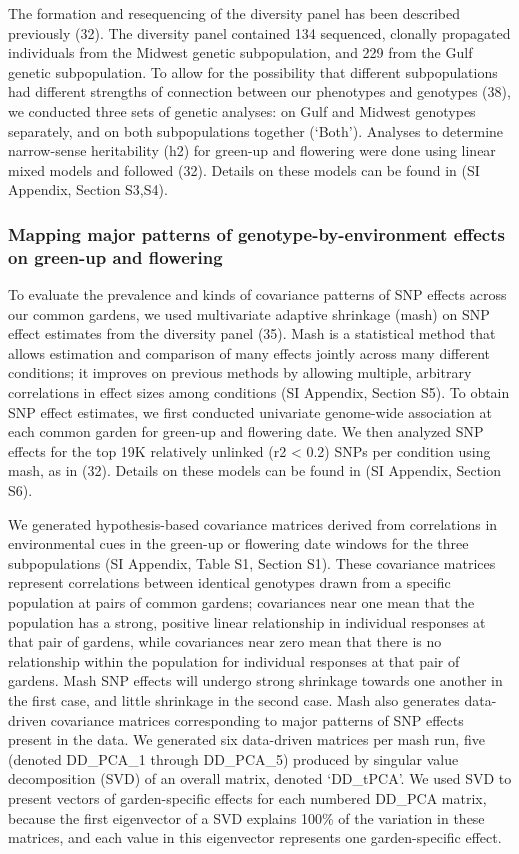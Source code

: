 \documentclass[
  9pt,
  twocolumn,
  twoside]{pnas-new}
\begin{document}
The formation and resequencing of the diversity panel has been described
previously (32). The diversity panel contained 134 sequenced, clonally
propagated individuals from the Midwest genetic subpopulation, and 229
from the Gulf genetic subpopulation. To allow for the possibility that
different subpopulations had different strengths of connection between
our phenotypes and genotypes (38), we conducted three sets of genetic
analyses: on Gulf and Midwest genotypes separately, and on both
subpopulations together (`Both'). Analyses to determine narrow-sense
heritability (h2) for green-up and flowering were done using linear
mixed models and followed (32). Details on these models can be found in
(SI Appendix, Section S3,S4).

\subsubsection{Mapping major patterns of genotype-by-environment effects
on green-up and
flowering}\label{mapping-major-patterns-of-genotype-by-environment-effects-on-green-up-and-flowering-1}

To evaluate the prevalence and kinds of covariance patterns of SNP
effects across our common gardens, we used multivariate adaptive
shrinkage (mash) on SNP effect estimates from the diversity panel (35).
Mash is a statistical method that allows estimation and comparison of
many effects jointly across many different conditions; it improves on
previous methods by allowing multiple, arbitrary correlations in effect
sizes among conditions (SI Appendix, Section S5). To obtain SNP effect
estimates, we first conducted univariate genome-wide association at each
common garden for green-up and flowering date. We then analyzed SNP
effects for the top 19K relatively unlinked (r2 \textless{} 0.2) SNPs
per condition using mash, as in (32). Details on these models can be
found in (SI Appendix, Section S6).

We generated hypothesis-based covariance matrices derived from
correlations in environmental cues in the green-up or flowering date
windows for the three subpopulations (SI Appendix, Table S1, Section
S1). These covariance matrices represent correlations between identical
genotypes drawn from a specific population at pairs of common gardens;
covariances near one mean that the population has a strong, positive
linear relationship in individual responses at that pair of gardens,
while covariances near zero mean that there is no relationship within
the population for individual responses at that pair of gardens. Mash
SNP effects will undergo strong shrinkage towards one another in the
first case, and little shrinkage in the second case. Mash also generates
data-driven covariance matrices corresponding to major patterns of SNP
effects present in the data. We generated six data-driven matrices per
mash run, five (denoted DD\_PCA\_1 through DD\_PCA\_5) produced by
singular value decomposition (SVD) of an overall matrix, denoted
`DD\_tPCA'. We used SVD to present vectors of garden-specific effects
for each numbered DD\_PCA matrix, because the first eigenvector of a SVD
explains 100\% of the variation in these matrices, and each value in
this eigenvector represents one garden-specific effect.
\end{document}
